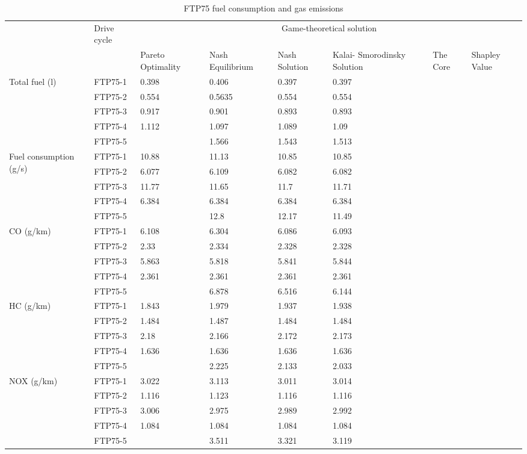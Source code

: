 \begin{table}[h]
\centering
\begin{tabular}{ |p{1.5cm}|p{1.5cm}|p{1.3cm}|p{1.3cm}|p{1.3cm}|p{1.3cm}|p{1.3cm}|p{1.3cm}|} 
 \hline
  \cline{3-8}
   & Drive cycle & \multicolumn{6}{|c|}{Game-theoretical solution} \\
   \cline{3-8}
   & & Pareto Optimality & Nash Equilibrium & Nash Solution & Kalai- Smorodinsky Solution & The Core & Shapley Value\\
 \hline\hline
 \multirow{5}{*}{\parbox{1.5cm}{Total fuel (l)}} 
 & FTP75-1 & 0.398 & 0.406 & 0.397 & 0.397 & & \\ 
 & FTP75-2 & 0.554 & 0.5635 & 0.554 & 0.554 & & \\  
 & FTP75-3 & 0.917 & 0.901 & 0.893 & 0.893 & & \\ 
 & FTP75-4 & 1.112 & 1.097 & 1.089 & 1.09 & & \\ 
 & FTP75-5 & & 1.566 & 1.543 & 1.513 & &\\ 
 \hline 
 \multirow{5}{*}{\parbox{1.5cm}{Fuel consumption (g/s)}} 
 & FTP75-1 & 10.88 & 11.13 & 10.85 & 10.85 & &\\ 
 & FTP75-2 & 6.077 & 6.109 & 6.082 & 6.082 & &\\ 
 & FTP75-3 & 11.77 & 11.65 & 11.7 & 11.71 & & \\ 
 & FTP75-4 & 6.384 & 6.384 & 6.384 & 6.384 & &\\ 
 & FTP75-5 & & 12.8 & 12.17 & 11.49 & & \\ 
 \hline 
 
 \multirow{5}{*}{\parbox{1.5cm}{CO (g/km)}} 
 & FTP75-1 & 6.108 & 6.304 & 6.086 & 6.093 & & \\ 
 & FTP75-2 & 2.33 & 2.334 & 2.328 & 2.328 & & \\ 
 & FTP75-3 & 5.863 & 5.818 & 5.841 & 5.844 & & \\ 
 & FTP75-4 & 2.361 & 2.361 & 2.361 & 2.361 & & \\ 
 & FTP75-5 & & 6.878 & 6.516 & 6.144 & & \\  
 \hline 
 
 \multirow{5}{*}{\parbox{1.5cm}{HC (g/km)}} 
 & FTP75-1 & 1.843 & 1.979 & 1.937 & 1.938 & & \\ 
 & FTP75-2 & 1.484 & 1.487 & 1.484 & 1.484 & & \\  
 & FTP75-3 & 2.18 & 2.166 & 2.172 & 2.173 & & \\ 
 & FTP75-4 & 1.636 & 1.636 & 1.636 & 1.636 & & \\ 
 & FTP75-5 & & 2.225 & 2.133 & 2.033 & & \\  
 \hline

 \multirow{5}{*}{\parbox{1.5cm}{NOX (g/km)}} 
 & FTP75-1 & 3.022 & 3.113 & 3.011 & 3.014 & & \\
 & FTP75-2 & 1.116 & 1.123 & 1.116 & 1.116 & & \\ 
 & FTP75-3 & 3.006 & 2.975 & 2.989 & 2.992 & & \\ 
 & FTP75-4 & 1.084 & 1.084 & 1.084 & 1.084 & & \\ 
 & FTP75-5 & & 3.511 & 3.321 & 3.119 & & \\ 
 \hline  
\end{tabular}
\caption{FTP75 fuel consumption and gas emissions}
\label{tab:fuelEmis}
\end{table}


